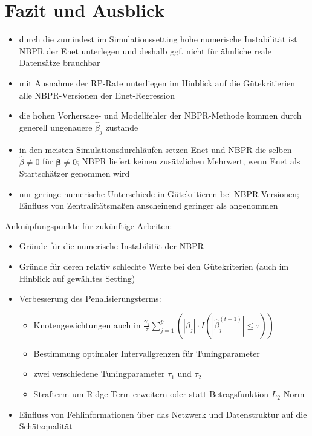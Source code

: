 \documentclass{beamer}
\begin{document}
\section{Fazit und Ausblick}
\begin{frame}
\begin{itemize}
\item durch die zumindest im Simulationssetting hohe numerische Instabilität ist NBPR der Enet unterlegen und deshalb ggf. nicht für ähnliche reale Datensätze brauchbar
\item mit Ausnahme der RP-Rate unterliegen im Hinblick auf die Gütekritierien alle NBPR-Versionen der Enet-Regression
\item die hohen Vorhersage- und Modellfehler der NBPR-Methode kommen durch generell ungenauere $\hat{\beta}_j$ zustande
\item in den meisten Simulationsdurchläufen setzen Enet und NBPR die selben $\hat{\beta}\neq 0$ für $\boldsymbol{\beta}\neq 0$; NBPR liefert keinen zusätzlichen Mehrwert, wenn Enet als Startschätzer genommen wird
\item nur geringe numerische Unterschiede in Gütekritieren bei NBPR-Versionen; Einfluss von Zentralitätsmaßen anscheinend geringer als angenommen
\end{itemize}
\end{frame}


\begin{frame}
Anknüpfungspunkte für zukünftige Arbeiten:
\begin{itemize}
\item Gründe für die numerische Instabilität der NBPR
\item Gründe für deren relativ schlechte Werte bei den Gütekriterien (auch im Hinblick auf gewähltes Setting)
\item Verbesserung des Penalisierungsterms:
\begin{itemize}
\item Knotengewichtungen auch in $\frac{\gamma_1}{\tau} \sum_{j=1}^{p}\left(|\beta_j|\cdot I(|\hat{\beta}_j^{(t-1)}| \leq \tau)\right)$
\item Bestimmung optimaler Intervallgrenzen für Tuningparameter
\item zwei verschiedene Tuningparameter $\tau_1$ und $\tau_2$
\item Strafterm um Ridge-Term erweitern oder statt Betragsfunktion $L_2$-Norm
\end{itemize}
\item Einfluss von Fehlinformationen über das Netzwerk und Datenstruktur auf die Schätzqualität
\end{itemize}
\end{frame}
\end{document}
